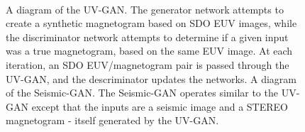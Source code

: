 \documentclass[11pt,a4paper,onecolumn]{report}
\begin{document}
  

\begin{figure}
  \centering
  \centering
  \\
  \caption{ A diagram of the UV-GAN. The generator network
  attempts to create a synthetic magnetogram based on SDO EUV images, while the
  discriminator network attempts to determine if a given input was a true magnetogram,
  based on the same EUV image. At each iteration, an SDO EUV/magnetogram pair is
  passed through the UV-GAN, and the descriminator updates the networks.
   A diagram of the Seismic-GAN. The Seismic-GAN
  operates similar to the UV-GAN except that the inputs are a seismic image and
  a STEREO magnetogram - itself generated by the UV-GAN.}
  \label{fig:solar_gans_diagram}
\end{figure}
\end{document}
